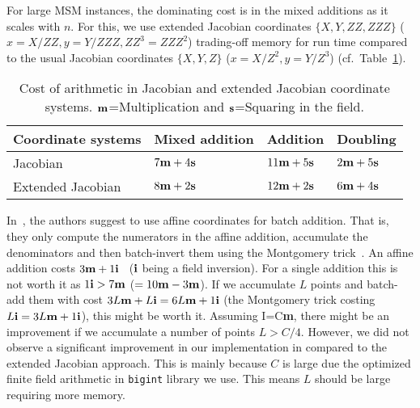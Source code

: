 \documentclass[journal=tches,spthm]{iacrtrans}
\newcommand{\bfm}{{\bf m}}
\newcommand{\bfs}{{\bf s}}
\newcommand{\bfi}{{\bf i}}
\begin{document}
For large MSM instances, the dominating cost is in the mixed additions as it
scales with $n$. For this, we use extended Jacobian coordinates $\{X, Y, ZZ,
ZZZ\}$ ($x=X/ZZ, y=Y/ZZZ, ZZ^3=ZZZ^2$) trading-off memory for run time compared
to the usual Jacobian coordinates $\{X,Y,Z\}$ ($x=X/Z^2, y=Y/Z^3$)
(cf.~Table~\ref{tab:ext-jac}).

\begin{table}[h]
\begin{center}
\begin{tabular}{l|l|l|l}
    Coordinate systems & Mixed addition & Addition & Doubling \\
    \hline
    Jacobian & $7\bfm+4\bfs$ & $11\bfm+5\bfs$ & $2\bfm+5\bfs$ \\
    \hline
    Extended Jacobian & $8\bfm+2\bfs$ & $12\bfm+2\bfs$ & $6\bfm+4\bfs$ \\
\end{tabular}
\end{center}
\caption{Cost of arithmetic in Jacobian and extended Jacobian coordinate systems. $\bfm$=Multiplication and $\bfs$=Squaring in the field.}
\label{tab:ext-jac}
\end{table}

\begin{remark}
    In~\cite{post:GabWil20}, the authors suggest to use affine coordinates for
    batch addition. That is, they only compute the numerators in the affine
    addition, accumulate the denominators and then batch-invert them using the
    Montgomery trick~\cite{MC:Montgomery87}. An affine addition costs
    $3\bfm+1\bfi$~ ($\bfi$ being a field inversion). For a single addition this
    is not worth it as $1\bfi > 7\bfm$ ($=10\bfm-3\bfm$).  If we accumulate $L$
    points and batch-add them with cost $3L\bfm+L\bfi=6L\bfm+1\bfi$ (the
    Montgomery trick costing $L\bfi=3L\bfm+1\bfi$), this might be worth it.
    Assuming I=C\bfm, there might be an improvement if we accumulate a number
    of points $L > C/4$.  However, we did not observe a significant improvement
    in our implementation in compared to the extended Jacobian approach. This
    is mainly because $C$ is large due the optimized finite field arithmetic in
    \texttt{bigint} library we use. This means $L$ should be large requiring
    more memory.
\end{remark}
\end{document}
